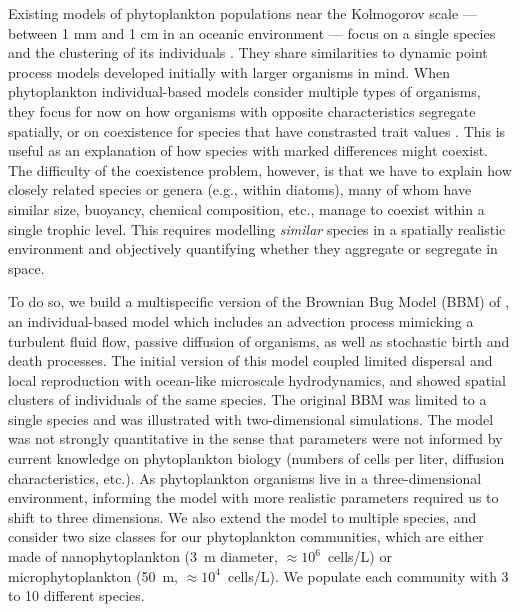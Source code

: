 \documentclass[english]{article}
\begin{document}
Existing models of phytoplankton populations near the Kolmogorov scale
--- between 1 mm and 1 cm in an oceanic environment \citep{barton_impact_2014}
--- focus on a single species and the clustering of its individuals
\citep{young_reproductive_2001,birch_master_2006,bouderbala_3d_2018,breier_emergence_2018}.
They share similarities to dynamic point process models \citep{law_population_2003,bolker_spatial_1999,plank_spatial_2015}
developed initially with larger organisms in mind. When phytoplankton
individual-based models consider multiple types of organisms, they
focus for now on how organisms with opposite characteristics \citep[e.g., increase versus decrease in density with turbulence in][]{borgnino_turbulence_2019,arrieta_fate_2020}
segregate spatially, or on coexistence for species that have constrasted
trait values \citep[e.g., size in][]{benczik_coexistence_2006}. This
is useful as an explanation of how species with marked differences
might coexist. The difficulty of the coexistence problem, however,
is that we have to explain how closely related species or genera (e.g.,
within diatoms), many of whom have similar size, buoyancy, chemical
composition, etc., manage to coexist within a single trophic level.
This requires modelling \emph{similar} species in a spatially realistic
environment and objectively quantifying whether they aggregate or
segregate in space. 

To do so, we build a multispecific version of the Brownian Bug Model
(BBM) of \citet{young_reproductive_2001}, an individual-based model
which includes an advection process mimicking a turbulent fluid
flow, passive diffusion of organisms, as well as stochastic birth
and death processes. The initial version of this model \citep{young_reproductive_2001}
coupled limited dispersal and local reproduction with ocean-like microscale
hydrodynamics, and showed spatial clusters of individuals of the same
species. The original BBM was limited to a single species and was
illustrated with two-dimensional simulations. The model was not strongly
quantitative \citep{picoche_rescience_2022} in the sense that parameters
were not informed by current knowledge on phytoplankton biology (numbers
of cells per liter, diffusion characteristics, etc.). As phytoplankton
organisms live in a three-dimensional environment, informing the model
with more realistic parameters required us to shift to three dimensions.
We also extend the model to multiple species, and consider two size
classes for our phytoplankton communities, which are either made of
nanophytoplankton (3~\textmu m diameter, $\approx10^{6}$~cells/L)
or microphytoplankton (50~\textmu m, $\approx10^{4}$~cells/L). We
populate each community with 3 to 10 different species.
\end{document}
